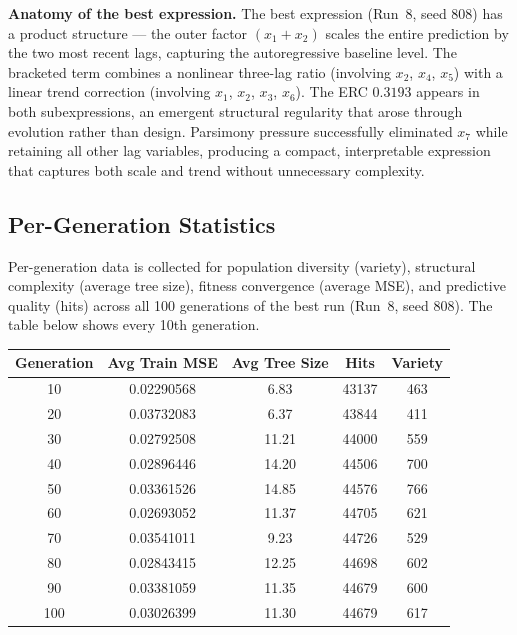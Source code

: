 \documentclass[12pt,a4paper]{article}
\begin{document}
\textbf{Anatomy of the best expression.} The best expression (Run~8, seed 808) has a product structure --- the outer factor $(x_1 + x_2)$ scales the entire prediction by the two most recent lags, capturing the autoregressive baseline level. The bracketed term combines a nonlinear three-lag ratio (involving $x_2$, $x_4$, $x_5$) with a linear trend correction (involving $x_1$, $x_2$, $x_3$, $x_6$). The ERC $0.3193$ appears in both subexpressions, an emergent structural regularity that arose through evolution rather than design. Parsimony pressure successfully eliminated $x_7$ while retaining all other lag variables, producing a compact, interpretable expression that captures both scale and trend without unnecessary complexity.

\subsection{Per-Generation Statistics}

Per-generation data is collected for population diversity (variety), structural complexity (average tree size), fitness convergence (average MSE), and predictive quality (hits) across all 100 generations of the best run (Run~8, seed 808). The table below shows every 10th generation.

\begin{center}
\begin{tabular}{ccccc}
\toprule
\textbf{Generation} & \textbf{Avg Train MSE} & \textbf{Avg Tree Size} & \textbf{Hits} & \textbf{Variety} \\
\midrule
10  & 0.02290568 & 6.83  & 43137 & 463 \\
20  & 0.03732083 & 6.37  & 43844 & 411 \\
30  & 0.02792508 & 11.21 & 44000 & 559 \\
40  & 0.02896446 & 14.20 & 44506 & 700 \\
50  & 0.03361526 & 14.85 & 44576 & 766 \\
60  & 0.02693052 & 11.37 & 44705 & 621 \\
70  & 0.03541011 & 9.23  & 44726 & 529 \\
80  & 0.02843415 & 12.25 & 44698 & 602 \\
90  & 0.03381059 & 11.35 & 44679 & 600 \\
100 & 0.03026399 & 11.30 & 44679 & 617 \\
\bottomrule
\end{tabular}
\end{center}
\end{document}
